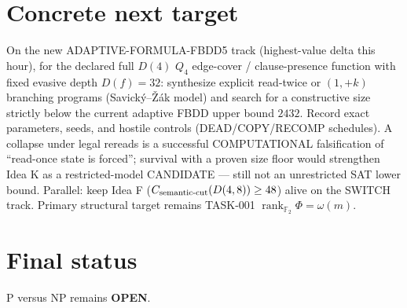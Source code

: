 \documentclass[11pt]{article}
\begin{document}
\section*{Concrete next target}
On the new ADAPTIVE-FORMULA-FBDD5 track (highest-value delta this hour), for the declared
full $D(4)$ $Q_4$ edge-cover / clause-presence function with fixed evasive depth $D(f)=32$:
synthesize explicit read-twice or $(1,+k)$ branching programs (Savick\'y--\v{Z}\'ak model)
and search for a constructive size strictly below the current adaptive FBDD upper bound
$2432$. Record exact parameters, seeds, and hostile controls (DEAD/COPY/RECOMP schedules).
A collapse under legal rereads is a successful COMPUTATIONAL falsification of ``read-once
state is forced''; survival with a proven size floor would strengthen Idea K as a
restricted-model CANDIDATE --- still not an unrestricted SAT lower bound.
Parallel: keep Idea F ($C_{\rm semantic\textrm{-}cut}(D(4,8))\ge 48$) alive on the SWITCH track.
Primary structural target remains TASK-001 $\operatorname{rank}_{\mathbb F_2}\Phi=\omega(m)$.

\section*{Final status}
P versus NP remains \textbf{OPEN}.

\end{document}
